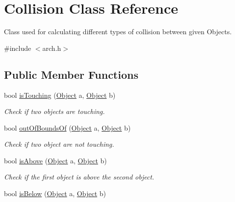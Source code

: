 \hypertarget{classCollision}{}\section{Collision Class Reference}
\label{classCollision}


Class used for calculating different types of collision between given Objects.  




{\ttfamily \#include $<$arch.\+h$>$}

\subsection*{Public Member Functions}
\begin{DoxyCompactItemize}
\item 
bool \hyperlink{classCollision_ae005eb1d857f6127b2673aecacbbd03f}{is\+Touching} (\hyperlink{classObject}{Object} a, \hyperlink{classObject}{Object} b)\hypertarget{classCollision_ae005eb1d857f6127b2673aecacbbd03f}{}\label{classCollision_ae005eb1d857f6127b2673aecacbbd03f}

\begin{DoxyCompactList}\small\item\em Check if two objects are touching. \end{DoxyCompactList}\item 
bool \hyperlink{classCollision_a4fae301767751ae007e953d1d2f49e7b}{out\+Of\+Bounds\+Of} (\hyperlink{classObject}{Object} a, \hyperlink{classObject}{Object} b)\hypertarget{classCollision_a4fae301767751ae007e953d1d2f49e7b}{}\label{classCollision_a4fae301767751ae007e953d1d2f49e7b}

\begin{DoxyCompactList}\small\item\em Check if two object are not touching. \end{DoxyCompactList}\item 
bool \hyperlink{classCollision_aecbf1758ca3a93a39568dbdf87213f20}{is\+Above} (\hyperlink{classObject}{Object} a, \hyperlink{classObject}{Object} b)\hypertarget{classCollision_aecbf1758ca3a93a39568dbdf87213f20}{}\label{classCollision_aecbf1758ca3a93a39568dbdf87213f20}

\begin{DoxyCompactList}\small\item\em Check if the first object is above the second object. \end{DoxyCompactList}\item 
bool \hyperlink{classCollision_ad5414ecc098c7d63155aea827c7d68b1}{is\+Below} (\hyperlink{classObject}{Object} a, \hyperlink{classObject}{Object} b)\hypertarget{classCollision_ad5414ecc098c7d63155aea827c7d68b1}{}\label{classCollision_ad5414ecc098c7d63155aea827c7d68b1}


\end{DoxyCompactItemize}
